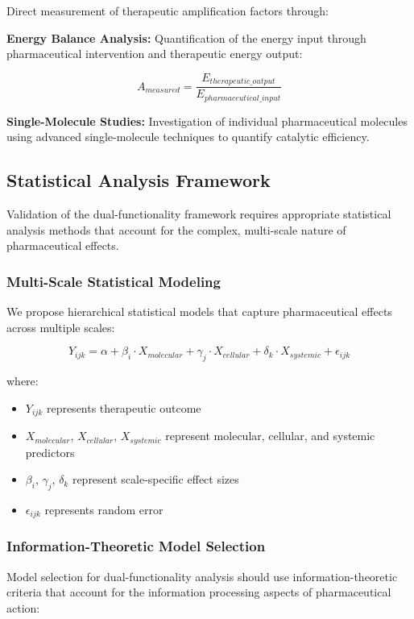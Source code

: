 \documentclass[12pt,a4paper]{article}
\begin{document}
Direct measurement of therapeutic amplification factors through:

\textbf{Energy Balance Analysis:}
Quantification of the energy input through pharmaceutical intervention and therapeutic energy output:

$$A_{measured} = \frac{E_{therapeutic\_output}}{E_{pharmaceutical\_input}}$$

\textbf{Single-Molecule Studies:}
Investigation of individual pharmaceutical molecules using advanced single-molecule techniques to quantify catalytic efficiency.

\subsection{Statistical Analysis Framework}

Validation of the dual-functionality framework requires appropriate statistical analysis methods that account for the complex, multi-scale nature of pharmaceutical effects.

\subsubsection{Multi-Scale Statistical Modeling}

We propose hierarchical statistical models that capture pharmaceutical effects across multiple scales:

$$Y_{ijk} = \alpha + \beta_i \cdot X_{molecular} + \gamma_j \cdot X_{cellular} + \delta_k \cdot X_{systemic} + \epsilon_{ijk}$$

where:
\begin{itemize}
\item $Y_{ijk}$ represents therapeutic outcome
\item $X_{molecular}$, $X_{cellular}$, $X_{systemic}$ represent molecular, cellular, and systemic predictors
\item $\beta_i$, $\gamma_j$, $\delta_k$ represent scale-specific effect sizes
\item $\epsilon_{ijk}$ represents random error
\end{itemize}

\subsubsection{Information-Theoretic Model Selection}

Model selection for dual-functionality analysis should use information-theoretic criteria that account for the information processing aspects of pharmaceutical action:
\end{document}
